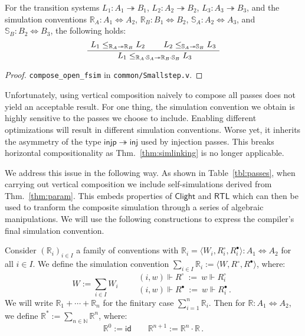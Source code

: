 \documentclass[acmsmall,authordraft]{acmart}
\newcommand{\kw}[1]{\ensuremath{ \mathsf{#1} }}
\newcommand{\que}{\circ}
\newcommand{\ans}{\bullet}
\begin{document}
\begin{theorem} \label{thm:simcomp} %
For the transition systems
$L_1 : A_1 \twoheadrightarrow B_1$,
$L_2 : A_2 \twoheadrightarrow B_2$,
$L_3 : A_3 \twoheadrightarrow B_3$,
and the simulation conventions
$\mathbb{R}_A : A_1 \Leftrightarrow A_2$,
$\mathbb{R}_B : B_1 \Leftrightarrow B_2$,
$\mathbb{S}_A : A_2 \Leftrightarrow A_3$, and
$\mathbb{S}_B : B_2 \Leftrightarrow B_3$,
the following holds:
\[
  \AxiomC{$L_1 \le_{\mathbb{R}_A \twoheadrightarrow \mathbb{R}_B} L_2$}
  \AxiomC{$L_2 \le_{\mathbb{S}_A \twoheadrightarrow \mathbb{S}_B} L_3$}
  \BinaryInfC{
    $L_1 \le_{\mathbb{R}_A \cdot \mathbb{S}_A \twoheadrightarrow
                   \mathbb{R}_B \cdot \mathbb{S}_B} L_3$}
  \DisplayProof
\]
\begin{proof}
\texttt{compose\_open\_fsim} in \texttt{common/Smallstep.v}.
\end{proof}
\end{theorem}

Unfortunately,
using vertical composition naively
to compose all passes
does not yield an acceptable result.
For one thing,
the simulation convention we obtain
is highly sensitive to the passes we choose to include.
Enabling different optimizations
will result in different simulation conventions.
Worse yet,
it inherits the asymmetry of the type 
$\kw{injp} \twoheadrightarrow \kw{inj}$
used by injection passes.
This breaks horizontal compositionality
as Thm.~\ref{thm:simlinking} is no longer applicable.

We address this issue in the following way.
As shown in Table~\ref{tbl:passes},
when carrying out vertical composition
we include self-simulations
derived from Thm.~\ref{thm:param}.
This embeds properties of
\kw{Clight} and \kw{RTL}
which can then be used to tranform the composite simulation
through a series of algebraic manipulations.
We will use the following constructions
to express the compiler's final simulation convention.

\begin{definition} \label{def:joins} %
Consider $(\mathbb{R}_i)_{i \in I}$
a family of conventions
with
$\mathbb{R}_i = \langle W_i, R_i^\que, R_i^\ans \rangle
  : A_1 \Leftrightarrow A_2$
for all $i \in I$.
We define the simulation convention
$\sum_{i \in I} \mathbb{R}_i := \langle W, R^\que, R^\ans \rangle$,
where:
\[
  W := \sum_{i \in I} W_i  \qquad
  \begin{array}{l}
  (i, w) \Vdash R^\que \: := \: w \Vdash R_i^\que \\[1ex]
  (i, w) \Vdash R^\ans \: := \: w \Vdash R_i^\ans \,.
  \end{array}
\]
We will write $\mathbb{R}_1 + \cdots + \mathbb{R}_n$
for the finitary case $\sum_{i=1}^n \mathbb{R}_i$.
Then for $\mathbb{R} : A_1 \Leftrightarrow A_2$,
we define
$\mathbb{R}^* := \sum_{n \in \mathbb{N}} \mathbb{R}^n$,
where:
\[
  \mathbb{R}^0 := \kw{id} \qquad
  \mathbb{R}^{n+1} := \mathbb{R}^n \cdot \mathbb{R} \,.
\]
\end{definition}
\end{document}
